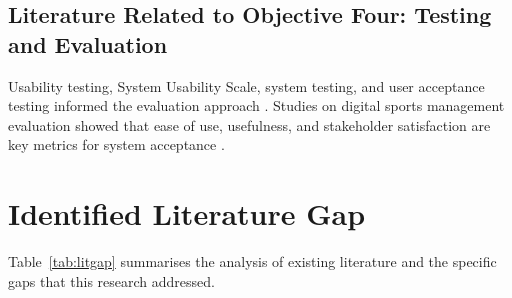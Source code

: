 \documentclass[12pt,a4paper]{report}
\begin{document}
\subsection{Literature Related to Objective Four: Testing and Evaluation}
Usability testing, System Usability Scale, system testing, and user acceptance testing
informed the evaluation approach \cite{brooke1996,pressman2019}. Studies on digital
sports management evaluation showed that ease of use, usefulness, and stakeholder
satisfaction are key metrics for system acceptance \cite{sarlak2024,smith2023}.

\section{Identified Literature Gap}
Table~\ref{tab:litgap} summarises the analysis of existing literature and the specific gaps
that this research addressed.
\end{document}
